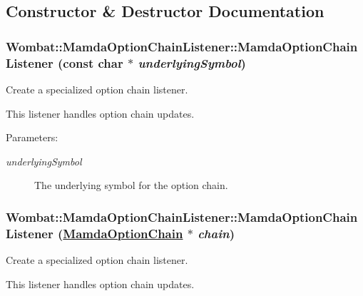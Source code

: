 \subsection{Constructor \& Destructor Documentation}
\hypertarget{classWombat_1_1MamdaOptionChainListener_ed246a918ce9f7f820daf0fedac8c540}{
\subsubsection[MamdaOptionChainListener]{\setlength{\rightskip}{0pt plus 5cm}Wombat::Mamda\-Option\-Chain\-Listener::Mamda\-Option\-Chain\-Listener (const char $\ast$ {\em underlying\-Symbol})}}
\label{classWombat_1_1MamdaOptionChainListener_ed246a918ce9f7f820daf0fedac8c540}


Create a specialized option chain listener. 

This listener handles option chain updates.

\begin{Desc}
\item[Parameters:]
\begin{description}
\item[{\em underlying\-Symbol}]The underlying symbol for the option chain. \end{description}
\end{Desc}
\hypertarget{classWombat_1_1MamdaOptionChainListener_34b3a4c1ef0cb23d98863c5852d3657f}{
\subsubsection[MamdaOptionChainListener]{\setlength{\rightskip}{0pt plus 5cm}Wombat::Mamda\-Option\-Chain\-Listener::Mamda\-Option\-Chain\-Listener (\hyperlink{classWombat_1_1MamdaOptionChain}{Mamda\-Option\-Chain} $\ast$ {\em chain})}}
\label{classWombat_1_1MamdaOptionChainListener_34b3a4c1ef0cb23d98863c5852d3657f}


Create a specialized option chain listener. 

This listener handles option chain updates.

